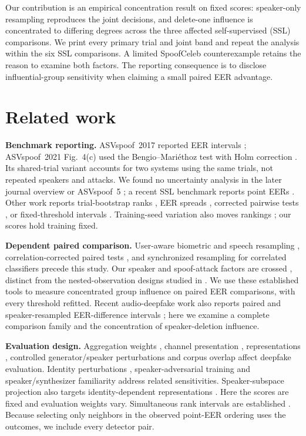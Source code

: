 \documentclass{article}
\begin{document}
Our contribution is an empirical concentration result on fixed scores: speaker-only resampling reproduces the joint decisions, and delete-one influence is concentrated to differing degrees across the three affected self-supervised (SSL) comparisons. We print every primary trial and joint band and repeat the analysis within the six SSL comparisons. A limited SpoofCeleb counterexample retains the reason to examine both factors. The reporting consequence is to disclose influential-group sensitivity when claiming a small paired EER advantage.

\section{Related work}
\label{sec:related}
\textbf{Benchmark reporting.} ASVspoof~2017 reported EER intervals \cite{delgado18}; ASVspoof~2021 Fig.~4(c) used the Bengio--Mari\'ethoz test \cite{bengio04} with Holm correction \cite{asvspoof21}. Its shared-trial variant accounts for two systems using the same trials, not repeated speakers and attacks. We found no uncertainty analysis in the later journal overview \cite{asvspoof21journal} or ASVspoof~5 \cite{asvspoof5eval}; a recent SSL benchmark reports point EERs \cite{spoofsuperb26}. Other work reports trial-bootstrap ranks \cite{xie26atadd}, EER spreads \cite{pascu24}, corrected pairwise tests \cite{martindonas24}, or fixed-threshold intervals \cite{weizman25}. Training-seed variation also moves rankings \cite{wang21_comparative}; our scores hold training fixed.

\textbf{Dependent paired comparison.} User-aware biometric and speech resampling \cite{poh07,wu17}, correlation-corrected paired tests \cite{wu16}, and synchronized resampling for correlated classifiers \cite{wukacker24} precede this study. Our speaker and spoof-attack factors are crossed \cite{cgm11,mccullagh00,owen07}, distinct from the nested-observation designs studied in \cite{anglin26}. We use these established tools to measure concentrated group influence on paired EER comparisons, with every threshold refitted. Recent audio-deepfake work also reports paired and speaker-resampled EER-difference intervals \cite{geng26}; here we examine a complete comparison family and the concentration of speaker-deletion influence.

\textbf{Evaluation design.} Aggregation weights \cite{kwok25}, channel presentation \cite{delgado26presentation}, representations \cite{benchaudit26}, controlled generator/speaker perturbations \cite{pirlogeanu26} and corpus overlap \cite{stanek26} affect deepfake evaluation. Identity perturbations \cite{dar26}, speaker-adversarial training \cite{dao26} and speaker/synthesizer familiarity \cite{hong25twinshift} address related sensitivities. Speaker-subspace projection also targets identity-dependent representations \cite{jung26snap}. Here the scores are fixed and evaluation weights vary. Simultaneous rank intervals are established \cite{almohamad19}. Because selecting only neighbors in the observed point-EER ordering uses the outcomes, we include every detector pair.
\end{document}
